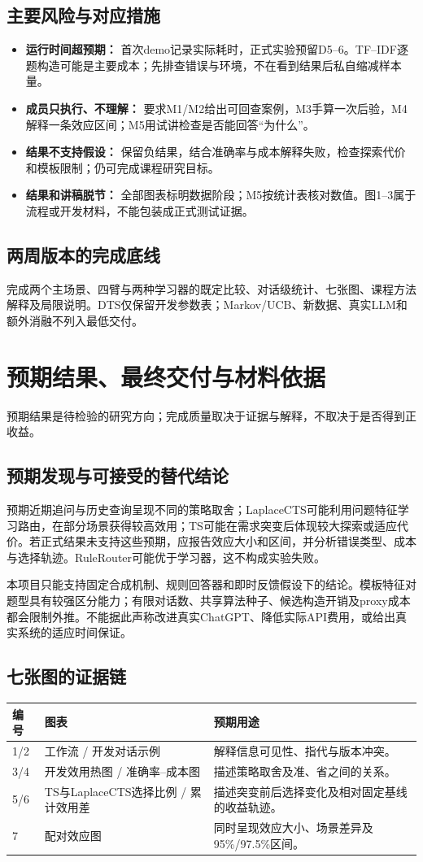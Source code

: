 \documentclass[11pt,a4paper]{article}
\newcommand{\note}[1]{{\small\color{muted}#1\par}}
\newcommand{\pagetitle}[2]{\section{#1}\note{#2}}
\begin{document}
\subsection{主要风险与对应措施}
\begin{itemize}
\item \textbf{运行时间超预期：} 首次demo记录实际耗时，正式实验预留D5--6。TF--IDF逐题构造可能是主要成本；先排查错误与环境，不在看到结果后私自缩减样本量。
\item \textbf{成员只执行、不理解：} 要求M1/M2给出可回查案例，M3手算一次后验，M4解释一条效应区间；M5用试讲检查是否能回答“为什么”。
\item \textbf{结果不支持假设：} 保留负结果，结合准确率与成本解释失败，检查探索代价和模板限制；仍可完成课程研究目标。
\item \textbf{结果和讲稿脱节：} 全部图表标明数据阶段；M5按统计表核对数值。图1--3属于流程或开发材料，不能包装成正式测试证据。
\end{itemize}

\subsection{两周版本的完成底线}
完成两个主场景、四臂与两种学习器的既定比较、对话级统计、七张图、课程方法解释及局限说明。DTS仅保留开发参数表；Markov/UCB、新数据、真实LLM和额外消融不列入最低交付。

\newpage
\pagetitle{预期结果、最终交付与材料依据}{预期结果是待检验的研究方向；完成质量取决于证据与解释，不取决于是否得到正收益。}
\subsection{预期发现与可接受的替代结论}
预期近期追问与历史查询呈现不同的策略取舍；LaplaceCTS可能利用问题特征学习路由，在部分场景获得较高效用；TS可能在需求突变后体现较大探索或适应代价。若正式结果未支持这些预期，应报告效应大小和区间，并分析错误类型、成本与选择轨迹。RuleRouter可能优于学习器，这不构成实验失败。

本项目只能支持固定合成机制、规则回答器和即时反馈假设下的结论。模板特征对题型具有较强区分能力；有限对话数、共享算法种子、候选构造开销及proxy成本都会限制外推。不能据此声称改进真实ChatGPT、降低实际API费用，或给出真实系统的适应时间保证。

\subsection{七张图的证据链}
\begin{center}\small
\begin{tabularx}{\linewidth}{@{}p{9mm}p{42mm}Y@{}}\toprule
编号 & 图表 & 预期用途 \\/2 & 工作流 / 开发对话示例 & 解释信息可见性、指代与版本冲突。\\
3/4 & 开发效用热图 / 准确率--成本图 & 描述策略取舍及准、省之间的关系。\\
5/6 & TS与LaplaceCTS选择比例 / 累计效用差 & 描述突变前后选择变化及相对固定基线的收益轨迹。\\
7 & 配对效应图 & 同时呈现效应大小、场景差异及95\%/97.5\%区间。\\\bottomrule
\end{tabularx}\end{center}
\end{document}
